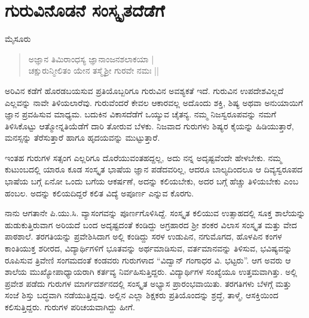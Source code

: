 \chapter{ಗುರುವಿನೊಡನೆ ಸಂಸ್ಕೃತದೆಡೆಗೆ}

\begin{center}
\smallskip

ಮೈಸೂರು
\end{center}

\begin{verse}
ಅಜ್ಞಾನ ತಿಮಿರಾಂಧಸ್ಯ ಜ್ಞಾನಾಂಜನಶಲಾಕಯಾ |\\
ಚಕ್ಷುರುನ್ಮೀಲಿತಂ ಯೇನ ತಸ್ಮೈಶ್ರೀ ಗುರವೇ ನಮಃ ||
\end{verse}
ಅರಿವಿನ ಕಡೆಗೆ ಹೊರಡಬಯಸುವ ಪ್ರತಿಯೊಬ್ಬರಿಗೂ ಗುರುವಿನ ಅವಶ್ಯಕತೆ ಇದೆ. ಗುರುವಿನ ಉಪದೇಶವಿಲ್ಲದೆ ಎಲ್ಲವನ್ನು ನಾವೇ ತಿಳಿಯಲಾರೆವು. ಗುರುವೆಂದರೆ ಕೇವಲ ಆಕಾರವಲ್ಲ ಅದೊಂದು ಶಕ್ತಿ, ಶಿಷ್ಯ ಅಥವಾ ಅನುಯಾಯಿಗೆ ಜ್ಞಾನ ಪ್ರವಹಿಸುವ ಮಾಧ್ಯಮ. ಬದುಕಿನ ವಿಕಾಸದೆಡೆಗೆ ಒಯ್ಯುವ ಚೈತನ್ಯ. ನಮ್ಮ ನಿಜಸ್ವರೂಪವನ್ನು ನಮಗೆ ತಿಳಿಸಿಕೊಟ್ಟು ಆತ್ಮೋನ್ನತಿಯೆಡೆಗೆ ದಾರಿ ತೋರುವ ಬೆಳಕು. ನಿಜವಾದ ಗುರುಗಳು ಶಿಷ್ಯರ ಕೈಯನ್ನು ಹಿಡಿಯುತ್ತಾರೆ, ಮನಸ್ಸನ್ನು ತೆರೆಸುತ್ತಾರೆ ಹಾಗೂ ಹೃದಯವನ್ನು ಮುಟ್ಟುತ್ತಾರೆ.

ಇಂತಹ ಗುರುಗಳ ಸತ್ಸಂಗ ಎಲ್ಲರಿಗೂ ದೊರೆಯುವಂತಹದ್ದಲ್ಲ, ಅದು ನನ್ನ ಅದೃಷ್ಟವೆಂದೇ ಹೇಳಬೇಕು. ನಮ್ಮ ಕುಟುಂಬದಲ್ಲಿ ಯಾರೂ ಕೂಡ ಸಂಸ್ಕೃತ ಭಾಷೆಯ ಜ್ಞಾನ ಪಡೆದವರಿಲ್ಲ, ಆದರೂ ಬಾಲ್ಯದಿಂದಲೂ ಆ ದಿವ್ಯಸ್ವರೂಪದ ಭಾಷೆಯ ಬಗ್ಗೆ ಏನೋ ಒಂದು ಬಗೆಯ ಆಕರ್ಷಣೆ, ಅದನ್ನು ಕಲಿಯಬೇಕು, ಅದರ ಬಗ್ಗೆ ಹೆಚ್ಚು ತಿಳಿಯಬೇಕು ಎಂಬ ಹಂಬಲ. ಅದನ್ನು ಕಲಿಯದಿದ್ದರೆ ಕಲಿತ ವಿದ್ಯೆ ಅಪೂರ್ಣ ಎನ್ನುವ ಕೊರಗು. 

ನಾನು ಆಗತಾನೇ ಪಿ.ಯು.ಸಿ. ವ್ಯಾಸಂಗವನ್ನು ಪೂರ್ಣಗೊಳಿಸಿದ್ದೆ. ಸಂಸ್ಕೃತ ಕಲಿಯುವ ಉತ್ಸಾಹದಲ್ಲಿ ಸೂಕ್ತ ಶಾಲೆಯನ್ನು ಹುಡುಕುತ್ತಿರುವಾಗ ಅರಿಯದೆ ಬಂದ ಅದೃಷ್ಟದಂತೆ ಕಂಡಿದ್ದು ಅಗ್ರಹಾರದ ಶ್ರೀ ಶಂಕರ ವಿಲಾಸ ಸಂಸ್ಕೃತ ಮತ್ತು ವೇದ ಪಾಠಶಾಲೆ. ತರಗತಿಯನ್ನು ಪ್ರವೇಶಿಸಿದಾಗ ಅಲ್ಲಿ ಕಂಡಿದ್ದು ಸರಳ ಉಡುಪಿನ, ನಗುಮೊಗದ, ಹೊಳಪಿನ ಕಂಗಳ ಕಾಂತಿಯುಕ್ತ ಶರೀರದ, ವಿದ್ಯಾರ್ಥಿಗಳಿಗೆ ಭೂತವನ್ನು ಅರ್ಥಮಾಡಿಸುವ, ವರ್ತಮಾನವನ್ನು ತಿಳಿಸುವ, ಭವಿಷ್ಯವನ್ನು ರೂಪಿಸುವ ತ್ರಿವೇಣಿ ಸಂಗಮದಂತೆ ಕಂಡವರು ಗುರುಗಳಾದ “ವಿದ್ವಾನ್ ಗಂಗಾಧರ ವಿ. ಭಟ್ಟರು”. ಆಗ ಅವರು ಆ ಶಾಲೆಯ ಮುಖ್ಯೋಪಾಧ್ಯಾಯರಾಗಿ ಕರ್ತವ್ಯ ನಿರ್ವಹಿಸುತ್ತಿದ್ದರು. ವಿದ್ಯಾರ್ಥಿಗಳ ಸಂಖ್ಯೆಯೂ ಉತ್ತಮವಾಗಿತ್ತು. ಅಲ್ಲಿ ಪ್ರವೇಶ ಪಡೆದು ಗುರುಗಳ ಮಾರ್ಗದರ್ಶನದಲ್ಲಿ ಸಂಸ್ಕೃತ ಅಭ್ಯಾಸ ಪ್ರಾರಂಭವಾಯಿತು. ತರಗತಿಗಳು ಬೆಳಗ್ಗೆ ಮತ್ತು ಸಂಜೆ ಶಿಸ್ತು ಬದ್ಧವಾಗಿ ನಡೆಯುತ್ತಿದ್ದವು. ಅಲ್ಲಿನ ಎಲ್ಲಾ ಶಿಕ್ಷಕರು ಪ್ರತಿಯೊಂದನ್ನು ಶ್ರದ್ಧೆ, ತಾಳ್ಮೆ, ಆಸಕ್ತಿಯಿಂದ ಕಲಿಸುತ್ತಿದ್ದರು. ಗುರುಗಳ ಪರಿಚಯವಾಗಿದ್ದು ಹೀಗೆ.

